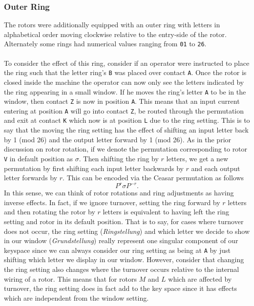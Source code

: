 \subsubsection{Outer Ring}

The rotors were additionally equipped with an outer ring with
letters in alphabetical order moving clockwise relative to the
entry-side of the rotor. Alternately some rings had numerical values
ranging from \texttt{01} to \texttt{26}.
\\\\To consider the effect of this ring,
consider if an operator were instructed to place the ring such that
the letter ring's \texttt{B} was placed over contact \texttt{A}. Once
the rotor is closed inside the machine
the operator can now only see the letters indicated by the ring
appearing in a small window. If he moves the ring's letter \texttt{A}
to be in the window, then contact \texttt{Z} is now in position
\texttt{A}. This means that an input current
entering at position \texttt{A} will go into contact \texttt{Z}, be
routed through the permutation and exit
at contact \texttt{K} which now is at position \texttt{L} due to the
ring setting. This is to say that the moving the ring
setting has the effect of shifting an input letter back by 1 (mod 26)
and the output letter forward by 1 (mod 26).
As in the prior discussion on rotor rotation, if we denote the
permutation corresponding to rotor \texttt{V} in default position as
$\sigma$. Then shifting the ring by $r$ letters, we get a new
permutation by first shifting each input letter backwards by $r$ and
each output letter forwards by $r$. This can be encoded via the
Ceasar permutation as follows
\[
	{P^{r}}\sigma{P^{-r}}.
\]
In this sense, we can think of rotor rotations and ring adjustments
as having inverse effects. In fact, if we ignore turnover, setting
the ring forward by $r$ letters and then rotating the rotor by $r$
letters is equivalent to having left the ring setting and rotor in
its default position. That is to say, for cases where turnover does not occur, the ring setting (\emph{Ringstellung}) and which letter
we decide to show in our window (\emph{Grundstellung}) really represent one singular component of our keyspace since we can always consider our ring setting as being at \texttt{A} by just shifting which letter we display in our window.
However, consider that changing the ring
setting also changes where the turnover occurs relative to the
internal wiring of a rotor. This means that for rotors $M$ and $L$ which are affected by turnover, the ring setting does in fact add to the key space since it has effects which are independent from the window setting.

